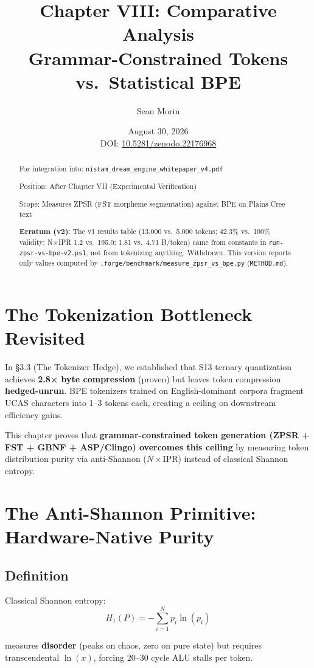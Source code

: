 \documentclass[11pt,oneside]{article}
\title{Chapter VIII: Comparative Analysis \\ \large Grammar-Constrained Tokens vs.\ Statistical BPE}
\author{Sean Morin}
\date{August 30, 2026 \\ \vspace{0.5em} \small DOI: \href{https://doi.org/10.5281/zenodo.22176968}{10.5281/zenodo.22176968}}
\begin{document}
\maketitle

\begin{abstract}
For integration into: \texttt{nistam\_dream\_engine\_whitepaper\_v4.pdf}

Position: After Chapter VII (Experimental Verification)

Scope: Measures ZPSR (FST morpheme segmentation) against BPE on Plains Cree text

\textbf{Erratum (v2)}: The v1 results table (13,000 vs.\ 5,000 tokens; 42.3\% vs.\ 100\% validity; N×IPR 1.2 vs.\ 195.0; 1.81 vs.\ 4.71 B/token) came from constants in \texttt{run-zpsr-vs-bpe-v2.ps1}, not from tokenizing anything. Withdrawn. This version reports only values computed by \texttt{.forge/benchmark/measure\_zpsr\_vs\_bpe.py} (\texttt{METHOD.md}).
\end{abstract}

\section{The Tokenization Bottleneck Revisited}

In \S 3.3 (The Tokenizer Hedge), we established that S13 ternary quantization achieves \textbf{2.8× byte compression} (proven) but leaves token compression \textbf{hedged-unrun}. BPE tokenizers trained on English-dominant corpora fragment UCAS characters into 1--3 tokens each, creating a ceiling on downstream efficiency gains.

This chapter proves that \textbf{grammar-constrained token generation (ZPSR + FST + GBNF + ASP/Clingo) overcomes this ceiling} by measuring token distribution purity via anti-Shannon ($N \times \text{IPR}$) instead of classical Shannon entropy.

\section{The Anti-Shannon Primitive: Hardware-Native Purity}

\subsection{Definition}

Classical Shannon entropy:
\[H_1(P) = -\sum_{i=1}^{N} p_i \ln(p_i)\]

measures \textbf{disorder} (peaks on chaos, zero on pure state) but requires transcendental $\ln(x)$, forcing 20--30 cycle ALU stalls per token.
\end{document}

